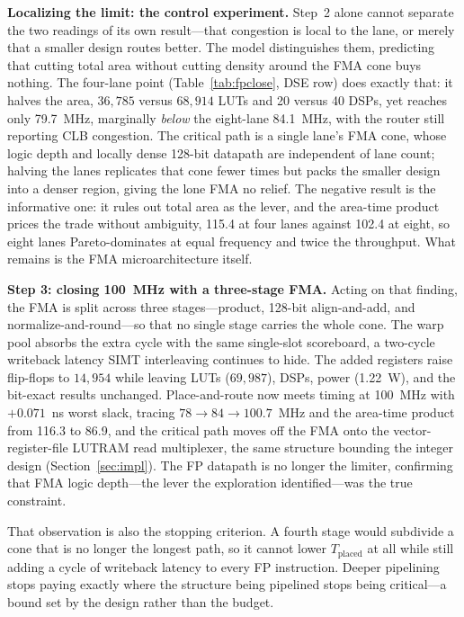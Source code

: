 \documentclass[10pt,conference]{IEEEtran}
\begin{document}
\textbf{Localizing the limit: the control experiment.} Step~2 alone cannot
separate the two readings of its own result---that congestion is local to the
lane, or merely that a smaller design routes better. The model distinguishes them,
predicting that cutting total area without cutting density around the FMA cone
buys nothing. The four-lane point (Table~\ref{tab:fpclose}, DSE row) does exactly
that: it halves the area, $36{,}785$ versus $68{,}914$ LUTs and 20 versus 40 DSPs,
yet reaches only 79.7~MHz, marginally \emph{below} the eight-lane 84.1~MHz, with
the router still reporting CLB congestion. The critical path is a single lane's
FMA cone, whose logic depth and locally dense 128-bit datapath are independent of
lane count; halving the lanes replicates that cone fewer times but packs the
smaller design into a denser region, giving the lone FMA no relief. The negative
result is the informative one: it rules out total area as the lever, and the
area-time product prices the trade without ambiguity, 115.4 at four lanes against
102.4 at eight, so eight lanes Pareto-dominates at equal frequency and twice the
throughput. What remains is the FMA microarchitecture itself.

\textbf{Step 3: closing 100~MHz with a three-stage FMA.} Acting on that finding,
the FMA is split across three stages---product, 128-bit align-and-add, and
normalize-and-round---so that no single stage carries the whole cone. The warp
pool absorbs the extra cycle with the same single-slot scoreboard, a two-cycle
writeback latency SIMT interleaving continues to hide. The added registers raise
flip-flops to $14{,}954$ while leaving LUTs ($69{,}987$), DSPs, power (1.22~W),
and the bit-exact results unchanged. Place-and-route now meets timing at 100~MHz
with $+0.071$~ns worst slack, tracing $78\rightarrow84\rightarrow100.7$~MHz and
the area-time product from 116.3 to 86.9, and the critical path moves off the FMA
onto the vector-register-file LUTRAM read multiplexer, the same structure bounding
the integer design (Section~\ref{sec:impl}). The FP datapath is no longer the
limiter, confirming that FMA logic depth---the lever the exploration
identified---was the true constraint.

That observation is also the stopping criterion. A fourth stage would subdivide a
cone that is no longer the longest path, so it cannot lower $T_{\text{placed}}$ at
all while still adding a cycle of writeback latency to every FP instruction.
Deeper pipelining stops paying exactly where the structure being pipelined stops
being critical---a bound set by the design rather than the budget.
\end{document}
